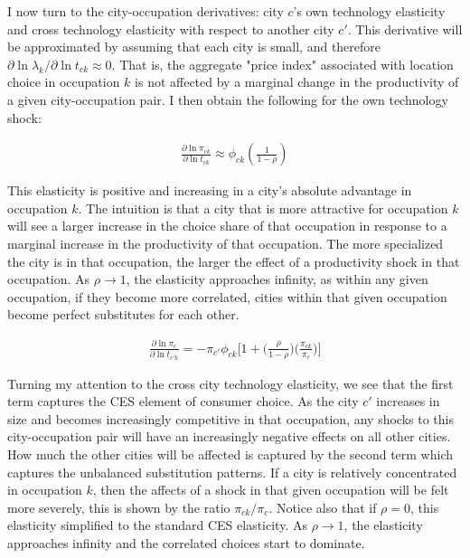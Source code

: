 \documentclass[10pt]{article}
\begin{document}
I now turn to the city-occupation derivatives: city $c$'s own technology elasticity and cross technology elasticity with respect to another city $c'$. This derivative will be approximated by assuming that each city is small, and therefore $\partial \ln \lambda_k / \partial \ln t_{ck} \approx 0$. That is, the aggregate "price index" associated with location choice in occupation $k$ is not affected by a marginal change in the productivity of a given city-occupation pair. I then obtain the following for the own technology shock:

\begin{align}
    \frac{\partial \ln \pi_{ck}}{\partial \ln t_{ck}} \approx \phi_{ck} \left( \frac{1}{1 - \rho} \right)
    \label{co_own_elasticity}
\end{align}

This elasticity is positive and increasing in a city's absolute advantage in occupation $k$. The intuition is that a city that is more attractive for occupation $k$ will see a larger increase in the choice share of that occupation in response to a marginal increase in the productivity of that occupation. The more specialized the city is in that occupation, the larger the effect of a productivity shock in that occupation. As $\rho \rightarrow 1$, the elasticity approaches infinity, as within any given occupation, if they become more correlated, cities within that given occupation become perfect substitutes for each other.

\begin{align}
    \frac{\partial\ln{\pi_{c}}}{\partial\ln{t_{{c'}k}}} = -{\pi_{c'}}{\phi_{ck}}\Big[1+\Big(\frac{\rho}{1-\rho}\Big)\Big(\frac{\pi_{ck}}{\pi_{c}}\Big)\Big]
    \label{co_cross_elasticity}
\end{align}

Turning my attention to the cross city technology elasticity, we see that the first term captures the CES element of consumer choice. As the city $c'$ increases in size and becomes increasingly competitive in that occupation, any shocks to this city-occupation pair will have an increasingly negative effects on all other cities. How much the other cities will be affected is captured by the second term which captures the unbalanced substitution patterns. If a city is relatively concentrated in occupation $k$, then the affects of a shock in that given occupation will be felt more severely, this is shown by the ratio $\pi_{ck} / \pi_c$. Notice also that if $\rho = 0$, this elasticity simplified to the standard CES elasticity. As $\rho \rightarrow 1$, the elasticity approaches infinity and the correlated choices start to dominate.
\end{document}
